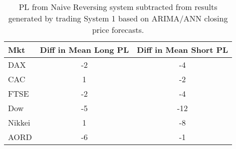 \begin{table}[ht]
\centering
\caption[ARIMA/ANN closing price system results minus Naive Reversing results]{PL from Naive Reversing system subtracted from results generated by trading System 1 based on ARIMA/ANN closing price forecasts.} 
\label{tab:chp_ts:arima_ann_sys1_diff}
\begin{tabular}{lcc}
  \toprule Mkt & Diff in Mean Long PL & Diff in Mean Short PL \\ 
  \midrule DAX & -2 & -4 \\ 
  CAC & 1 & -2 \\ 
  FTSE & -2 & -4 \\ 
  Dow & -5 & -12 \\ 
  Nikkei & 1 & -8 \\ 
  AORD & -6 & -1 \\ 
   \bottomrule \end{tabular}
\end{table}
